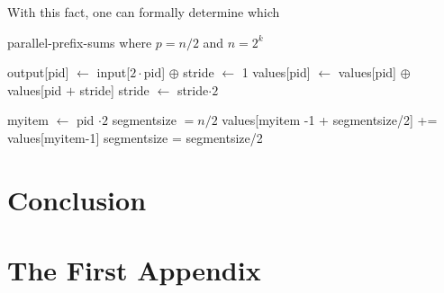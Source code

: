 \documentclass[12pt,twoside]{reedthesis}
\begin{document}
With this fact, one can formally determine which 


\begin{algorithm}[h!]
\caption{parallel-prefix-sums where $p = n/2$ and $n=2^k$}
\begin{algorithmic}
\STATE output[pid] $\leftarrow$ input[$2\cdot \mbox{pid}$] $\oplus$
\STATE stride $\leftarrow$ 1
\STATE values[pid] $\leftarrow$ values[pid] $\oplus$ values[pid $+$ stride] 
\STATE stride $\leftarrow$ stride$\cdot 2$
\ENDWHILE
\RETURN

\STATE myitem $\leftarrow$ pid $\cdot 2$ 
\STATE segmentsize $= n/2$
\STATE values[myitem -1 + segmentsize/2] += values[myitem-1]
\ENDIF
\STATE segmentsize = segmentsize/2

\ENDWHILE
\end{algorithmic}
\end{algorithm}
	
\chapter*{Conclusion}
	\setcounter{chapter}{4}
	\setcounter{section}{0}
	

    \appendix
      \chapter{The First Appendix}



  \backmatter 

    \nocite{*}
    
\end{document}
